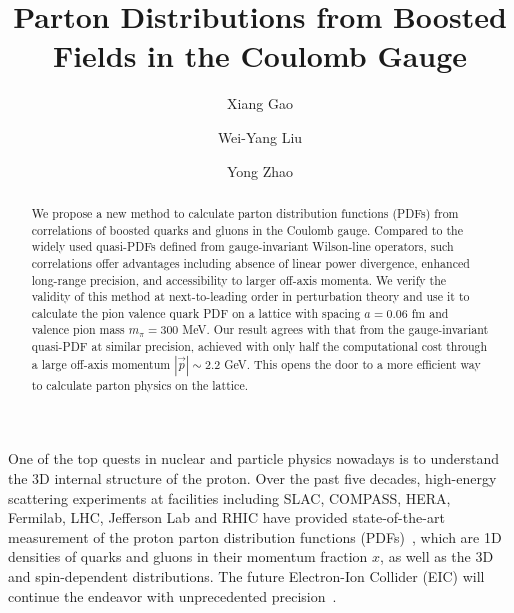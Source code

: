 \documentclass[prd,twocolumn,preprintnumbers,showpacs,nofootinbib,superscriptaddress,notitlepage,floatfix]{revtex4-1}
\begin{document}
\title{Parton Distributions from Boosted Fields in the Coulomb Gauge}


\author{Xiang Gao}

\author{Wei-Yang Liu}

\author{Yong Zhao}

\begin{abstract}
We propose a new method to calculate parton distribution functions (PDFs) from correlations of boosted quarks and gluons in the Coulomb gauge.
Compared to the widely used quasi-PDFs defined from gauge-invariant Wilson-line operators, such correlations offer advantages including absence of linear power divergence, enhanced long-range precision, and accessibility to larger off-axis momenta. We verify the validity of this method at next-to-leading order in perturbation theory and use it to calculate the pion valence quark PDF on a lattice with spacing $a=0.06$ fm and valence pion mass $m_\pi=300$ MeV.
Our result agrees with that from the gauge-invariant quasi-PDF at similar precision, achieved with only half the computational cost through a large off-axis momentum $|\vec{p}|\sim2.2$ GeV.
This opens the door to a more efficient way to calculate parton physics on the lattice.
\end{abstract}

\maketitle

One of the top quests in nuclear and particle physics nowadays is to understand the 3D internal structure of the proton.
Over the past five decades, high-energy scattering experiments at facilities including SLAC, COMPASS, HERA, Fermilab, LHC, Jefferson Lab and RHIC have provided state-of-the-art measurement of the proton parton distribution functions (PDFs)~\cite{ParticleDataGroup:2022pth}, which are 1D densities of quarks and gluons in their momentum fraction $x$, as well as the 3D and spin-dependent distributions. The future Electron-Ion Collider (EIC) will continue the endeavor with unprecedented precision~\cite{Accardi:2012qut,AbdulKhalek:2021gbh}.
\end{document}
